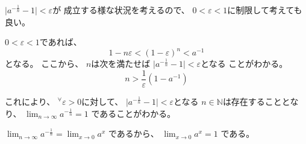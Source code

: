 \documentclass[12pt,b5paper]{ltjsarticle}
\begin{document}
\begin{enumerate}
      $\lvert a^{-\frac{1}{n}} -1 \rvert < \varepsilon$が
      成立する様な状況を考えるので、
      $0<\varepsilon<1$に制限して考えても良い。

      $0<\varepsilon<1$であれば、
      \begin{equation}
       1-n\varepsilon < (1-\varepsilon)^{n} < a^{-1}
      \end{equation}
      となる。
      ここから、
      $n$は次を満たせば
      $\lvert a^{-\frac{1}{n}} -1 \rvert < \varepsilon$となる
      ことがわかる。
      \begin{equation}
       n > \frac{1}{\varepsilon}(1-a^{-1})
      \end{equation}

      これにより、
      ${}^{\forall}\varepsilon > 0$に対して、
      $\lvert a^{-\frac{1}{n}} -1 \rvert < \varepsilon$となる
      $n\in\mathbb{N}$は存在することとなり、
      $\displaystyle \lim_{n\to\infty} a^{-\frac{1}{n}}=1$
      であることがわかる。

      $\displaystyle \lim_{n\to\infty}a^{-\frac{1}{n}}=\lim_{x\to 0} a^{x}$
      であるから、
      $\displaystyle \lim_{x\to 0} a^{x}=1$
      である。

\end{enumerate}


\hrulefill
\end{document}
